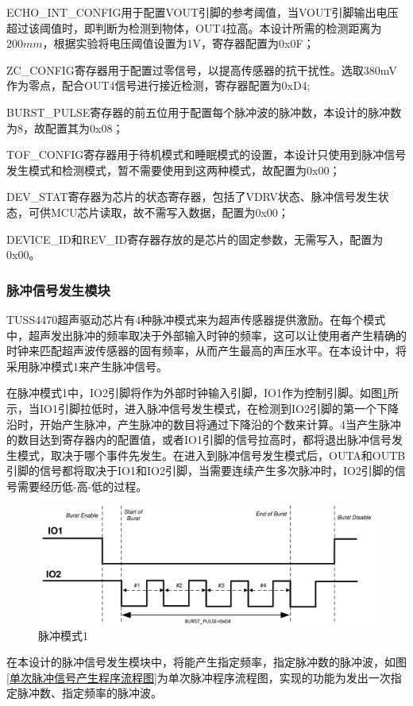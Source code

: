 ECHO\_INT\_CONFIG用于配置VOUT引脚的参考阈值，当VOUT引脚输出电压超过该阈值时，即判断为检测到物体，OUT4拉高。本设计所需的检测距离为$200mm$，根据实验将电压阈值设置为1V，寄存器配置为0x0F；\par
ZC\_CONFIG寄存器用于配置过零信号，以提高传感器的抗干扰性。选取380mV作为零点，配合OUT4信号进行接近检测，寄存器配置为0xD4;\par
BURST\_PULSE寄存器的前五位用于配置每个脉冲波的脉冲数，本设计的脉冲数为8，故配置其为0x08；\par
TOF\_CONFIG寄存器用于待机模式和睡眠模式的设置，本设计只使用到脉冲信号发生模式和检测模式，暂不需要使用到这两种模式，故配置为0x00；\par
DEV\_STAT寄存器为芯片的状态寄存器，包括了VDRV状态、脉冲信号发生状态，可供MCU芯片读取，故不需写入数据，配置为0x00；\par
DEVICE\_ID和REV\_ID寄存器存放的是芯片的固定参数，无需写入，配置为0x00。

\subsubsection{脉冲信号发生模块}
TUSS4470超声驱动芯片有4种脉冲模式来为超声传感器提供激励。在每个模式中，超声发出脉冲的频率取决于外部输入时钟的频率，这可以让使用者产生精确的时钟来匹配超声波传感器的固有频率，从而产生最高的声压水平。在本设计中，将采用脉冲模式1来产生脉冲信号。\par
在脉冲模式1中，IO2引脚将作为外部时钟输入引脚，IO1作为控制引脚。如图\ref{脉冲模式1}所示，当IO1引脚拉低时，进入脉冲信号发生模式，在检测到IO2引脚的第一个下降沿时，开始产生脉冲，产生脉冲的数目将通过下降沿的个数来计算。4当产生脉冲的数目达到寄存器内的配置值，或者IO1引脚的信号拉高时，都将退出脉冲信号发生模式，取决于哪个事件先发生。在进入到脉冲信号发生模式后，OUTA和OUTB引脚的信号都将取决于IO1和IO2引脚，当需要连续产生多次脉冲时，IO2引脚的信号需要经历低-高-低的过程。
\begin{figure}[ht]
	\centering
	\includegraphics[width=12cm]{figure/IO MODE1.png}
	\caption{脉冲模式1}
	\label{脉冲模式1}
\end{figure}
在本设计的脉冲信号发生模块中，将能产生指定频率，指定脉冲数的脉冲波，如图\ref{单次脉冲信号产生程序流程图}为单次脉冲程序流程图，实现的功能为发出一次指定脉冲数、指定频率的脉冲波。



